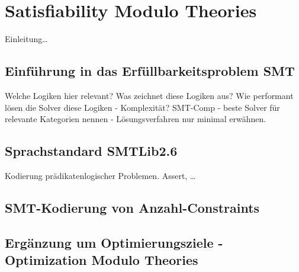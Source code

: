 \section{Satisfiability Modulo Theories}
Einleitung\ldots

\subsection{Einführung in das Erfüllbarkeitsproblem SMT}
Welche Logiken hier relevant?
Was zeichnet diese Logiken aus?
Wie performant lösen die Solver diese Logiken - Komplexität?
SMT-Comp - beste Solver für relevante Kategorien nennen - Lösungsverfahren nur minimal erwähnen.

\subsection{Sprachstandard SMTLib2.6}
Kodierung prädikatenlogischer Problemen.
Assert, \ldots

\subsection{SMT-Kodierung von Anzahl-Constraints}

\subsection{Ergänzung um Optimierungsziele - Optimization Modulo Theories}
